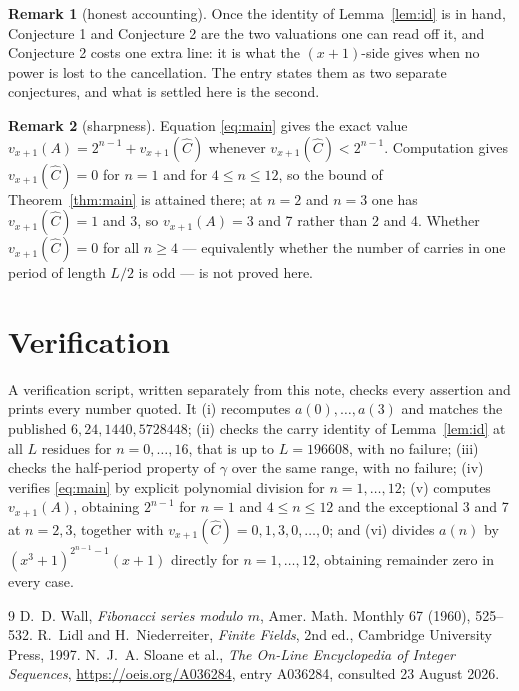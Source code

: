 \documentclass[11pt,a4paper]{article}
\theoremstyle{plain}
\theoremstyle{definition}
\newtheorem*{remark}{Remark}
\newcommand{\Chat}{\widehat{C}}
\begin{document}
\begin{remark}[honest accounting]
Once the identity of Lemma~\ref{lem:id} is in hand, Conjecture 1 and Conjecture 2 are the
two valuations one can read off it, and Conjecture 2 costs one extra line: it is what the
$(x+1)$-side gives when no power is lost to the cancellation. The entry states them as two
separate conjectures, and what is settled here is the second.
\end{remark}

\begin{remark}[sharpness]
Equation \eqref{eq:main} gives the exact value $v_{x+1}(A)=2^{n-1}+v_{x+1}(\Chat)$ whenever
$v_{x+1}(\Chat)<2^{n-1}$. Computation gives $v_{x+1}(\Chat)=0$ for $n=1$ and for
$4\le n\le12$, so the bound of Theorem~\ref{thm:main} is attained there; at $n=2$ and $n=3$
one has $v_{x+1}(\Chat)=1$ and 3, so $v_{x+1}(A)=3$ and 7 rather than 2 and 4. Whether
$v_{x+1}(\Chat)=0$ for all $n\ge4$ --- equivalently whether the number of carries in one
period of length $L/2$ is odd --- is not proved here.
\end{remark}

\section{Verification}

A verification script, written separately from this note, checks every assertion and prints
every number quoted. It (i) recomputes $a(0),\dots,a(3)$ and matches the published
$6,24,1440,5728448$; (ii) checks the carry identity of Lemma~\ref{lem:id} at all $L$
residues for $n=0,\dots,16$, that is up to $L=196608$, with no failure; (iii) checks the
half-period property of $\gamma$ over the same range, with no failure; (iv) verifies
\eqref{eq:main} by explicit polynomial division for $n=1,\dots,12$; (v) computes
$v_{x+1}(A)$, obtaining $2^{n-1}$ for $n=1$ and $4\le n\le12$ and the exceptional 3 and 7
at $n=2,3$, together with $v_{x+1}(\Chat)=0,1,3,0,\dots,0$; and (vi) divides $a(n)$ by
$(x^{3}+1)^{2^{n-1}-1}(x+1)$ directly for $n=1,\dots,12$, obtaining remainder zero in every
case.

\begin{thebibliography}{9}
 D.~D. Wall, \emph{Fibonacci series modulo $m$}, Amer. Math. Monthly 67
(1960), 525--532.
 R.~Lidl and H.~Niederreiter, \emph{Finite Fields}, 2nd ed., Cambridge
University Press, 1997.
 N.~J.~A. Sloane et al., \emph{The On-Line Encyclopedia of Integer
Sequences}, \url{https://oeis.org/A036284}, entry A036284, consulted 23 August 2026.
\end{thebibliography}
\end{document}
